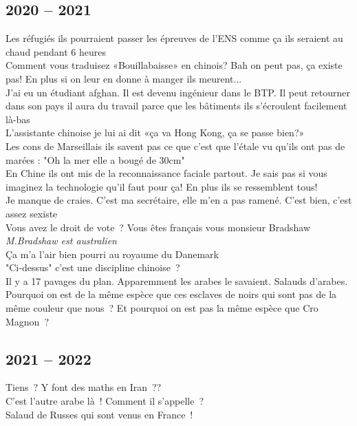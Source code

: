 \documentclass[french, a4paper, openany]{book}
\begin{document}
	\subsection*{2020 -- 2021}
		\noindent \og Les réfugiés ils pourraient passer les épreuves de l'ENS comme ça ils seraient au chaud pendant 6 heures \fg \\
		\og Comment vous traduisez «Bouillabaisse» en chinois? Bah on peut pas, ça existe pas! En plus si on leur en donne à manger ils meurent... \fg \\
		\og J'ai eu un étudiant afghan. Il est devenu ingénieur dans le BTP. Il peut retourner dans son pays il aura du travail parce que les bâtiments ils s'écroulent facilement là-bas \fg \\
		\og L'assistante chinoise je lui ai dit «ça va Hong Kong, ça se passe bien?» \fg \\
		\og Les cons de Marseillais ils savent pas ce que c'est que l'étale vu qu'ils ont pas de marées : "Oh la mer elle a bougé de 30cm" \fg \\
		\og En Chine ils ont mis de la reconnaissance faciale partout. Je sais pas si vous imaginez la technologie qu'il faut pour ça! En plus ils se ressemblent tous! \fg \\
		\og Je manque de craies. C'est ma secrétaire, elle m'en a pas ramené. C'est bien, c'est assez sexiste \fg \\
		\og Vous avez le droit de vote~? Vous êtes français vous monsieur Bradshaw \fg \emph{M.Bradshaw est australien} \\
		\og Ça m'a l'air bien pourri au royaume du Danemark \fg \\
		\og "Ci-dessus" c'est une discipline chinoise~? \fg \\
		\og Il y a 17 pavages du plan. Apparemment les arabes le savaient. Salauds d'arabes. \fg \\
		\og Pourquoi on est de la même espèce que ces esclaves de noirs qui sont pas de la même couleur que nous~? Et pourquoi on est pas la même espèce que Cro Magnon~? \fg \\

	\subsection*{2021 -- 2022}
	
		\noindent \og Tiens~? Y font des maths en Iran~?? \fg \\
		\og C'est l'autre arabe là~! Comment il s'appelle~? \fg \\
		\og Salaud de Russes qui sont venus en France~! \fg \\
\end{document}
